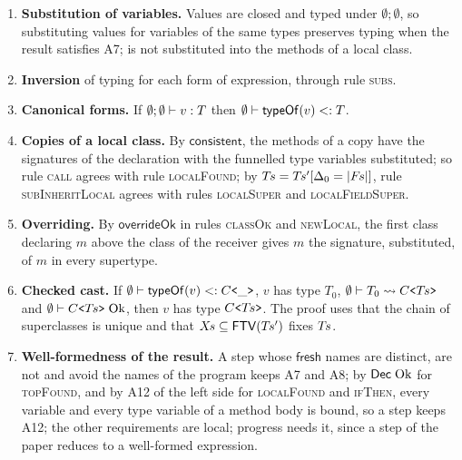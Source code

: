 \begin{enumerate}
In case \textsc{castVar}, $T_1$ comes from the induction hypothesis, and $\subtype{\Delta_\sigma}{X\sigma}{T_1}$ follows from the bound of $X$ (rule \textsc{subVar} when $X$ stays, the premise on $\pl{G}$ when $X$ is replaced) and transitivity.
Rule \textsc{subs} lifts the tested expression from $T_0\sigma$ to $T_1$.
$T_0\sigma$ is a type variable when $T_0$ is a type variable of a method of a local class whose bound mentions a type variable of $\pl{X}$.
\item \textbf{Substitution of variables.} Values are closed and typed under $\emptyset;\emptyset$, so substituting values for variables of the same types preserves typing when the result satisfies A7; \Q@this@ is not substituted into the methods of a local class.
\item \textbf{Inversion} of typing for each form of expression, through rule \textsc{subs}.
\item \textbf{Canonical forms.} If $\emptyset;\emptyset\vdash v : T$ then $\emptyset\vdash \mathsf{typeOf}(v) <: T$.
\item \textbf{Copies of a local class.} By $\mathsf{consistent}$, the methods of a copy have the signatures of the declaration with the funnelled type variables substituted; so rule \textsc{call} agrees with rule \textsc{localFound}; by $T\mkern-2mu s=T\mkern-2mu s'[\Delta_0=|F\mkern-2mu s|]$, rule \textsc{subInheritLocal} agrees with rules \textsc{localSuper} and \textsc{localFieldSuper}.
\item \textbf{Overriding.} By $\mathsf{overrideOk}$ in rules \textsc{classOk} and \textsc{newLocal}, the first class declaring $m$ above the class of the receiver gives $m$ the signature, substituted, of $m$ in every supertype.
\item \textbf{Checked cast.} If $\emptyset\vdash\mathsf{typeOf}(v)<:C\text{\ttfamily <}\_\text{\ttfamily >}$, $v$ has type $T_0$, $\emptyset\vdash T_0 \rightsquigarrow C\text{\ttfamily <}T\mkern-2mu s\text{\ttfamily >}$ and $\emptyset \vdash C\text{\ttfamily <}T\mkern-2mu s\text{\ttfamily >}\mskip5mu\mathrm{Ok}$, then $v$ has type $C\text{\ttfamily <}T\mkern-2mu s\text{\ttfamily >}$.
The proof uses that the chain of superclasses is unique and that $X\mkern-2mu s\subseteq\mathsf{FTV}(T\mkern-2mu s')$ fixes $T\mkern-2mu s$.
\item \textbf{Well-formedness of the result.} A step whose $\mathsf{fresh}$ names are distinct, are not \Q@this@ and avoid the names of the program keeps A7 and A8; by $\mathsf{Dec}\mskip5mu\mathrm{Ok}$ for \textsc{topFound}, and by A12 of the left side for \textsc{localFound} and \textsc{ifThen}, every variable and every type variable of a method body is bound, so a step keeps A12; the other requirements are local; progress needs it, since a step of the paper reduces to a well-formed expression.

\end{enumerate}
